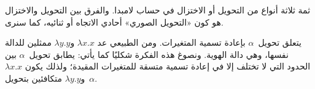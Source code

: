 \documentclass[../../../include/open-logic-section]{subfiles}
\begin{document}

ثمة ثلاثة أنواع من التحويل أو الاختزال في حساب لامبدا. والفرق بين
التحويل والاختزال هو كون «التحويل الصوري» أحادي الاتجاه أو ثنائيه، كما
سنرى.

يتعلق تحويل~$\alpha$ بإعادة تسمية المتغيرات. ومن الطبيعي عد
$\lambda x. x$ و$\lambda y.y$ ممثلين للدالة نفسها، وهي دالة الهوية.
ونصوغ هذه الفكرة شكليًا كما يأتي: يطابق تحويل~$\alpha$ بين الحدود التي
لا تختلف إلا في إعادة تسمية متسقة للمتغيرات المقيدة؛ ولذلك يكون
$\lambda x.x$ و$\lambda y.y$ متكافئين بتحويل~$\alpha$.
\end{document}
